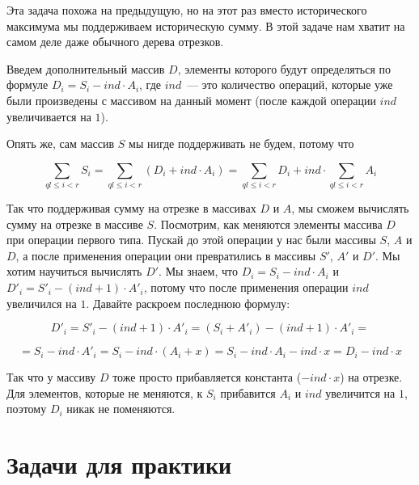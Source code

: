 Эта задача похожа на предыдущую, но на этот раз вместо исторического максимума мы поддерживаем историческую сумму. В этой задаче нам хватит на самом деле даже обычного дерева отрезков.

Введем дополнительный массив $D$, элементы которого будут определяться по формуле $D_i = S_i - ind \cdot A_i$, где $ind$~--- это количество операций, которые уже были произведены с массивом на данный момент (после каждой операции $ind$ увеличивается на $1$).

Опять же, сам массив $S$ мы нигде поддерживать не будем, потому что

$$
\sum_{ql \le i < r} S_i = \sum_{ql \le i < r} \left(D_i + ind \cdot A_i\right) = \sum_{ql \le i < r} D_i + ind \cdot \sum_{ql \le i < r} A_i
$$

Так что поддерживая сумму на отрезке в массивах $D$ и $A$, мы сможем вычислять сумму на отрезке в массиве $S$.
Посмотрим, как меняются элементы массива $D$ при операции первого типа.
Пускай до этой операции у нас были массивы $S$, $A$ и $D$, а после применения операции они превратились в массивы $S'$, $A'$ и $D'$.
Мы хотим научиться вычислять $D'$. Мы знаем, что $D_i = S_i - ind \cdot A_i$ и $D'_i = S'_i - (ind + 1) \cdot A'_i$, потому что после применения операции $ind$ увеличился на $1$. Давайте раскроем последнюю формулу:

$$D'_i = S'_i - (ind + 1) \cdot A'_i = (S_i + A'_i) - (ind + 1) \cdot A'_i=$$

$$= S_i - ind \cdot A'_i = S_i - ind \cdot (A_i + x) = S_i - ind \cdot A_i - ind \cdot x = D_i - ind \cdot x$$

Так что у массиву $D$ тоже просто прибавляется константа ($-ind \cdot x$) на отрезке. Для элементов, которые не меняются, к $S_i$ прибавится $A_i$ и $ind$ увеличится на $1$, поэтому $D_i$ никак не поменяются.



\section{Задачи для практики}

